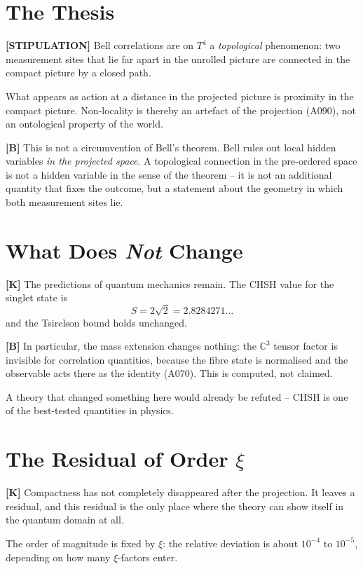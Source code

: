 \section{The Thesis}

\textbf{[STIPULATION]} Bell correlations are on $T^4$ a \emph{topological}
phenomenon: two measurement sites that lie far apart in the unrolled picture are
connected in the compact picture by a closed path.

What appears as action at a distance in the projected picture is proximity in the
compact picture. Non-locality is thereby an artefact of the projection (A090),
not an ontological property of the world.

\textbf{[B]} This is not a circumvention of Bell's theorem. Bell rules out local
hidden variables \emph{in the projected space}. A topological connection in the
pre-ordered space is not a hidden variable in the sense of the theorem -- it is
not an additional quantity that fixes the outcome, but a statement about the
geometry in which both measurement sites lie.

\section{What Does \emph{Not} Change}

\textbf{[K]} The predictions of quantum mechanics remain. The CHSH value for the
singlet state is
\[
  S = 2\sqrt2 = 2{.}8284271\ldots
\]
and the Tsirelson bound holds unchanged.

\textbf{[B]} In particular, the mass extension changes nothing: the
$\mathbb{C}^3$ tensor factor is invisible for correlation quantities, because the
fibre state is normalised and the observable acts there as the identity (A070).
This is computed, not claimed.

A theory that changed something here would already be refuted -- CHSH is one of
the best-tested quantities in physics.

\section{The Residual of Order $\xi$}

\textbf{[K]} Compactness has not completely disappeared after the projection. It
leaves a residual, and this residual is the only place where the theory can show
itself in the quantum domain at all.

The order of magnitude is fixed by $\xi$: the relative deviation is about
$10^{-4}$ to $10^{-5}$, depending on how many $\xi$-factors enter.


